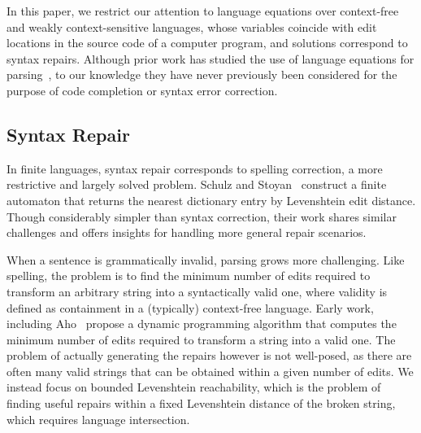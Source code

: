 \documentclass[sigplan,review,anonymous,acmsmall]{acmart}\settopmatter{printfolios=false,printccs=false,printacmref=false}
\begin{document}
In this paper, we restrict our attention to language equations over context-free and weakly context-sensitive languages, whose variables coincide with edit locations in the source code of a computer program, and solutions correspond to syntax repairs. Although prior work has studied the use of language equations for parsing~\cite{might2011parsing}, to our knowledge they have never previously been considered for the purpose of code completion or syntax error correction.



\subsection{Syntax Repair}

In finite languages, syntax repair corresponds to spelling correction, a more restrictive and largely solved problem. Schulz and Stoyan~\cite{schulz2002fast} construct a finite automaton that returns the nearest dictionary entry by Levenshtein edit distance. Though considerably simpler than syntax correction, their work shares similar challenges and offers insights for handling more general repair scenarios.

When a sentence is grammatically invalid, parsing grows more challenging. Like spelling, the problem is to find the minimum number of edits required to transform an arbitrary string into a syntactically valid one, where validity is defined as containment in a (typically) context-free language. Early work, including Aho~\cite{irons1963error, aho1972minimum} propose a dynamic programming algorithm that computes the minimum number of edits required to transform a string into a valid one. The problem of actually generating the repairs however is not well-posed, as there are often many valid strings that can be obtained within a given number of edits. We instead focus on bounded Levenshtein reachability, which is the problem of finding useful repairs within a fixed Levenshtein distance of the broken string, which requires language intersection.
\end{document}
